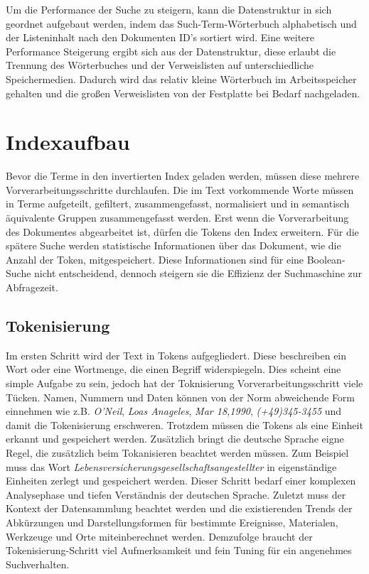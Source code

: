 \pagebreak 
Um die Performance der Suche zu steigern, kann die Datenstruktur in sich
geordnet aufgebaut werden, indem das Such-Term-Wörterbuch alphabetisch
und der Listeninhalt nach den Dokumenten ID’s sortiert wird. Eine
weitere Performance Steigerung ergibt sich aus der Datenstruktur, diese
erlaubt die Trennung des Wörterbuches und der Verweislisten auf
unterschiedliche Speichermedien. Dadurch wird das relativ kleine
Wörterbuch im Arbeitsspeicher gehalten und die großen Verweislisten von
der Festplatte bei Bedarf nachgeladen.

\section[Indexaufbau ]{Indexaufbau }
Bevor die Terme in den invertierten Index geladen werden, müssen diese
mehrere Vorverarbeitungsschritte durchlaufen. Die im Text vorkommende
Worte müssen in Terme aufgeteilt, gefiltert, zusammengefasst,
normalisiert und in semantisch äquivalente Gruppen zusammengefasst
werden. Erst wenn die Vorverarbeitung des Dokumentes abgearbeitet ist,
dürfen die Tokens den Index erweitern. 
\newline
Für die spätere Suche werden statistische Informationen über das
Dokument, %
wie die Anzahl der Token, mitgespeichert.
\newline
Diese Informationen sind für eine Boolean-Suche nicht entscheidend,
dennoch steigern sie die Effizienz der Suchmaschine zur Abfragezeit.

\subsection[Tokenisierung]{Tokenisierung}
Im ersten Schritt wird der Text in Tokens aufgegliedert. Diese
beschreiben ein Wort oder eine Wortmenge, die einen Begriff
widerspiegeln. Dies scheint eine simple Aufgabe zu sein, jedoch hat der
Toknisierung Vorverarbeitungsschritt viele Tücken. 
\bigbreak
Namen, Nummern und Daten können von der Norm abweichende Form einnehmen
wie z.B. \textit{O'Neil}, \textit{Loas Anageles}, \textit{Mar 18,1990},
\textit{(+49)345-3455} und damit die Tokenisierung erschweren. Trotzdem müssen
die Tokens als eine Einheit erkannt und gespeichert werden. 
\newline
Zusätzlich bringt die deutsche Sprache eigne Regel, die zusätzlich beim
Tokanisieren beachtet werden müssen. Zum Beispiel muss das Wort
\textit{Lebensversicherungsgesellschaftsangestellter} in
eigenständige Einheiten zerlegt und gespeichert werden. Dieser Schritt
bedarf einer komplexen Analysephase und tiefen Verständnis der
deutschen Sprache. 
\newline
Zuletzt muss der Kontext der Datensammlung beachtet werden und die
existierenden Trends der Abkürzungen und Darstellungsformen für
bestimmte Ereignisse, Materialen, Werkzeuge und Orte miteinberechnet
werden.
\bigbreak
Demzufolge braucht der Tokenisierung-Schritt viel Aufmerksamkeit und
fein Tuning für ein angenehmes Suchverhalten. \ 

